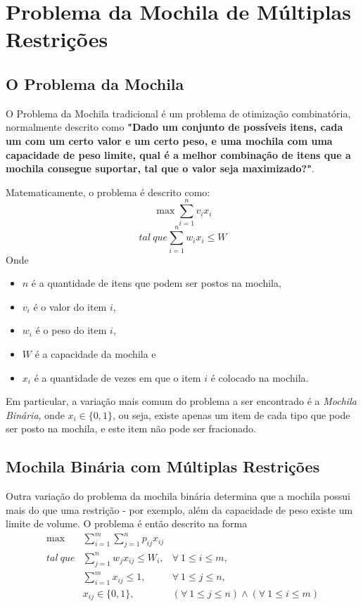 \section{Problema da Mochila de Múltiplas Restrições}

\subsection{O Problema da Mochila}
O Problema da Mochila tradicional é um problema de otimização combinatória, normalmente descrito como  \textbf{"Dado um conjunto de possíveis itens, cada um com um certo valor e um certo peso, e uma mochila com uma capacidade de peso limite, qual é a melhor combinação de itens que a mochila consegue suportar, tal que o valor seja maximizado?"}.

Matematicamente, o problema é descrito como:
	\begin{displaymath}
	\max \sum_{i=1}^{n} v_i x_i
	\end{displaymath}
	\begin{displaymath}
	tal\ que \sum_{i=1}^{n} w_i x_i \leq W
	\end{displaymath}
	Onde 
	\begin{itemize}
		\item $n$ é a quantidade de itens que podem ser postos na mochila,
		\item $v_i$ é o valor do item $i$,
		\item  $w_i$ é o peso do item $i$, 
		\item $W$ é a capacidade da mochila e
		\item $x_i$ é a quantidade de vezes em que o item $i$ é colocado na mochila.
	\end{itemize}
	
Em particular, a variação mais comum do problema a ser encontrado é a \textit{Mochila Binária}, onde $x_i \in \{0,1\}$, ou seja, existe apenas um item de cada tipo que pode ser posto na mochila, e este item não pode ser fracionado.

\subsection{Mochila Binária com Múltiplas Restrições}
Outra variação do problema da mochila binária determina que a mochila possui mais do que uma restrição - por exemplo, além da capacidade de peso existe um limite de volume. O problema é então descrito na forma
\begin{eqnarray}
\max & \sum_{i=1}^{m} \sum_{j=1}^{n} p_{ij} x_{ij} & \nonumber\\
tal\ que & \sum_{j=1}^{n} w_j x_{ij} \leq W_i, & \forall\ 1 \leq i \leq m,\nonumber\\
		& \sum_{i=1}^{m} x_{ij} \leq 1, & \forall\ 1 \leq j \leq n, \nonumber\\
		& x_{ij} \in \{0,1\}, & (\forall\ 1 \leq j \leq n )\wedge (\forall\ 1 \leq i \leq m) \nonumber
\end{eqnarray}


